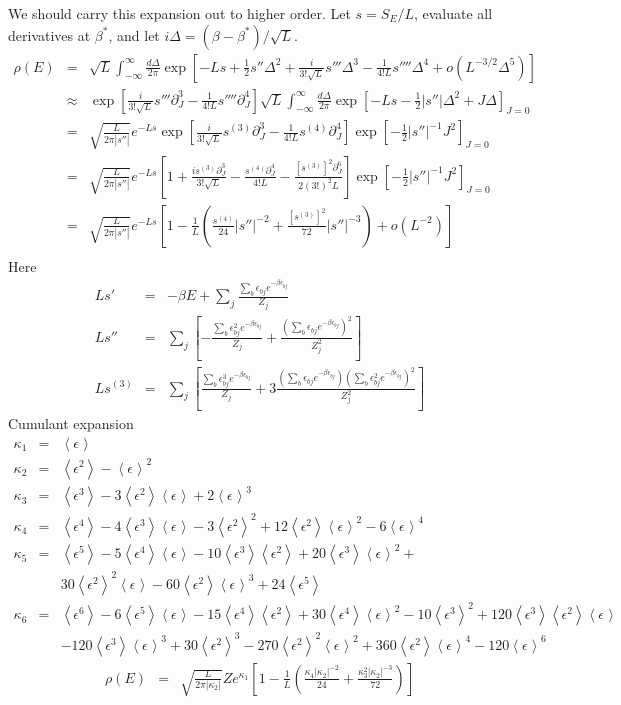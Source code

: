 \documentclass[11pt]{article}
\newcommand{\bea}{\begin{eqnarray}}
\newcommand{\eea}{\end{eqnarray}}
\newcommand{\braket}[1]{\left \langle #1 \right \rangle}
\newcommand{\m}[1]{\braket{\epsilon^{#1}}}
\newcommand{\kap}[1]{\kappa_{#1}}
\begin{document}
We should carry this expansion out to higher order. Let $s = S_E/L$,  evaluate all derivatives at $\beta^*$, and let $i \Delta = (\beta - \beta^*) / \sqrt{L}$. 
\bea
\rho(E) & = &  \sqrt{L} \int_{-\infty}^{\infty} \frac{d\Delta}{2 \pi} \exp \left[-L s + \frac{1}{2} s'' \Delta^2 + \frac{i}{3!\sqrt{L}} s''' \Delta^3 - \frac{1}{4! L} s'''' \Delta^4 + o(L^{-3/2} \Delta^5) \right] \\
& \approx & \exp \left[  \frac{i}{3!\sqrt{L}} s''' \partial_J^3 - \frac{1}{4! L} s'''' \partial_J^4 \right] \sqrt{L} \int_{-\infty}^{\infty} \frac{d\Delta}{2 \pi} \exp \left[-L s - \frac{1}{2} |s''| \Delta^2 + J \Delta \right]_{J=0} \\
& = &  \sqrt{\frac{L}{2 \pi |s''|}} e^{-Ls} \exp \left[  \frac{i}{3!\sqrt{L}} s^{(3)} \partial_J^3 - \frac{1}{4! L} s^{(4)} \partial_J^4 \right] \exp \left[- \frac{1}{2} |s''|^{-1} J^2 \right]_{J = 0} \\
& = &  \sqrt{\frac{L}{2 \pi |s''|}}e^{-Ls} \left[1 + \frac{i s^{(3)} \partial_J^3}{3!\sqrt{L}}  - \frac{ s^{(4)} \partial_J^4}{4! L}  - \frac{[s^{(3)}]^2 \partial_J^6}{2(3!)^2 L} \right] \exp \left[- \frac{1}{2} |s''|^{-1} J^2 \right]_{J = 0} \\
& = & \sqrt{\frac{L}{2 \pi |s''|}}e^{-Ls} \left[1 - \frac{1}{L} \left( \frac{ s^{(4)}}{24} |s''|^{-2} + \frac{[s^{(3)}]^2 }{72} |s''|^{-3} \right) + o(L^{-2}) \right] \\
\eea
Here
\bea
L s' &=& - \beta E + \sum_j \frac{\sum_b \epsilon_{bj}e^{-\beta \epsilon_{bj}} }{Z_j} \\
L s'' &=& \sum_j \left[ - \frac{\sum_b \epsilon_{bj}^2 e^{-\beta \epsilon_{bj}} }{Z_j} + \frac{ \left(\sum_b \epsilon_{bj} e^{-\beta \epsilon_{bj}} \right)^2}{Z^2_j} \right] \\
Ls^{(3)} & = & \sum_j \left[ \frac{\sum_b \epsilon_{bj}^3 e^{-\beta \epsilon_{bj}} }{Z_j} + 3 \frac{  \left(\sum_b \epsilon_{bj} e^{-\beta \epsilon_{bj}} \right) \left(\sum_b \epsilon^2_{bj} e^{-\beta \epsilon_{bj}} \right)^2}{Z^2_j} \right]
\eea
Cumulant expansion
\bea
\kap{1} &=& \m{} \\
\kap{2} &=& \m{2} - \m{}^2 \\
\kap{3} &=& \m{3} - 3 \m{2} \m{} + 2 \m{}^3 \\
\kap{4} &=& \m{4} - 4 \m{3} \m{} - 3 \m{2}^2 + 12 \m{2} \m{}^2 - 6 \m{}^4 \\
\kap{5} &=& \m{5} - 5\m{4}\m{} - 10\m{3}\m{2} + 20\m{3}\m{}^2 + \\
& & 30\m{2}^2\m{} - 60\m{2}\m{}^3 + 24\m{5} \\
\kap{6} &=& \m{6} - 6\m{5}\m{} - 15\m{4}\m{2} + 30\m{4}\m{}^2 - 10\m{3}^2 + 120\m{3}\m{2}\m{} \\ 
& & - 120\m{3}\m{}^3 + 30\m{2}^3 - 270\m{2}^2\m{}^2 + 360\m{2}\m{}^4 - 120\m{}^6
\eea
\bea
\rho(E) & = & \sqrt{\frac{L}{2 \pi |\kap{2}|}} Z e^{\kap{1}} \left[ 1 - \frac{1}{L} \left( \frac{\kap{4} |\kap{2}|^{-2}}{24} + \frac{\kap{3}^2 |\kap{2}|^{-3}}{72}  \right) \right]
\eea
\end{document}
